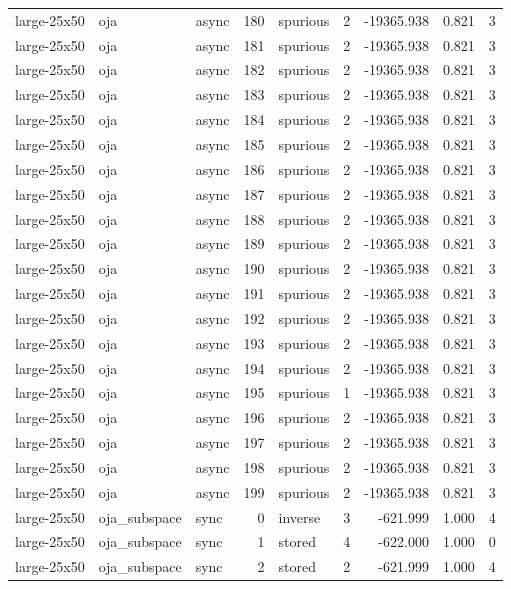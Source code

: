 \begin{tabular}{lllrlrrrr}
large-25x50 & oja & async & 180 & spurious & 2 & -19365.938 & 0.821 & 3 \\
large-25x50 & oja & async & 181 & spurious & 2 & -19365.938 & 0.821 & 3 \\
large-25x50 & oja & async & 182 & spurious & 2 & -19365.938 & 0.821 & 3 \\
large-25x50 & oja & async & 183 & spurious & 2 & -19365.938 & 0.821 & 3 \\
large-25x50 & oja & async & 184 & spurious & 2 & -19365.938 & 0.821 & 3 \\
large-25x50 & oja & async & 185 & spurious & 2 & -19365.938 & 0.821 & 3 \\
large-25x50 & oja & async & 186 & spurious & 2 & -19365.938 & 0.821 & 3 \\
large-25x50 & oja & async & 187 & spurious & 2 & -19365.938 & 0.821 & 3 \\
large-25x50 & oja & async & 188 & spurious & 2 & -19365.938 & 0.821 & 3 \\
large-25x50 & oja & async & 189 & spurious & 2 & -19365.938 & 0.821 & 3 \\
large-25x50 & oja & async & 190 & spurious & 2 & -19365.938 & 0.821 & 3 \\
large-25x50 & oja & async & 191 & spurious & 2 & -19365.938 & 0.821 & 3 \\
large-25x50 & oja & async & 192 & spurious & 2 & -19365.938 & 0.821 & 3 \\
large-25x50 & oja & async & 193 & spurious & 2 & -19365.938 & 0.821 & 3 \\
large-25x50 & oja & async & 194 & spurious & 2 & -19365.938 & 0.821 & 3 \\
large-25x50 & oja & async & 195 & spurious & 1 & -19365.938 & 0.821 & 3 \\
large-25x50 & oja & async & 196 & spurious & 2 & -19365.938 & 0.821 & 3 \\
large-25x50 & oja & async & 197 & spurious & 2 & -19365.938 & 0.821 & 3 \\
large-25x50 & oja & async & 198 & spurious & 2 & -19365.938 & 0.821 & 3 \\
large-25x50 & oja & async & 199 & spurious & 2 & -19365.938 & 0.821 & 3 \\
large-25x50 & oja\_subspace & sync & 0 & inverse & 3 & -621.999 & 1.000 & 4 \\
large-25x50 & oja\_subspace & sync & 1 & stored & 4 & -622.000 & 1.000 & 0 \\
large-25x50 & oja\_subspace & sync & 2 & stored & 2 & -621.999 & 1.000 & 4 \\

\end{tabular}

